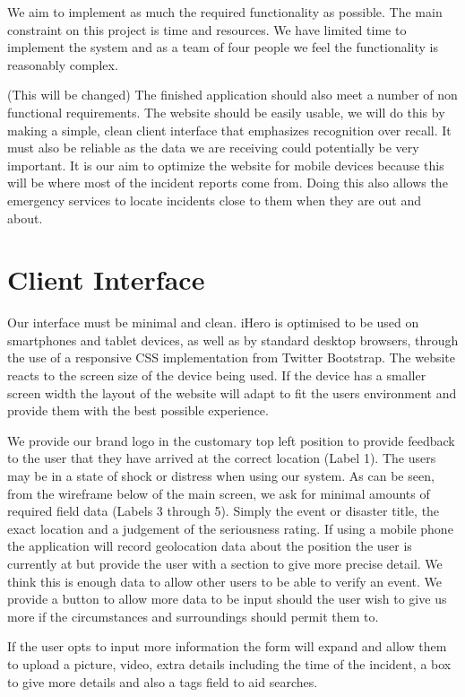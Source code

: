 \documentclass{sig-alt-release2}
\begin{document}
We aim to implement as much the required functionality as possible. The main constraint on this project is time and resources. We have limited time to implement the system and as a team of four people we feel the functionality is reasonably complex.                            

(This will be changed) The finished application should also meet a number of non functional requirements. The website should be easily usable, we will do this by making a simple, clean client interface that emphasizes recognition over recall. It must also be reliable as the data we are receiving could potentially be very important. It is our aim to optimize the website for mobile devices because this will be where most of the incident reports come from. Doing this also allows the emergency services to locate incidents close to them when they are out and about.

\section{Client Interface}
Our interface must be minimal and clean. iHero is optimised to be used on smartphones and tablet devices, as well as by standard desktop browsers, through the use of a responsive CSS implementation from Twitter Bootstrap. The website reacts to the screen size of the device being used. If the device has a smaller screen width the layout of the website will adapt to fit the users environment and provide them with the best possible experience.

We provide our brand logo in the customary top left position to provide feedback to the user that they have arrived at the correct location (Label 1). The users may be in a state of shock or distress when using our system. As can be seen, from the wireframe below of the main screen, we ask for minimal amounts of required field data (Labels 3 through 5). Simply the event or disaster title, the exact location and a judgement of the seriousness rating. If using a mobile phone the application will record geolocation data about the position the user is currently at but provide the user with a section to give more precise detail. We think this is enough data to allow other users to be able to verify an event. We provide a button to allow more data to be input should the user wish to give us more if the circumstances and surroundings should permit them to.

If the user opts to input more information the form will expand and allow them to upload a picture, video, extra details including the time of the incident, a box to give more details and also a tags field to aid searches.
\end{document}
